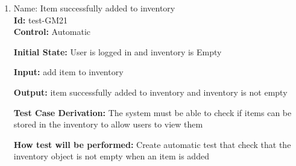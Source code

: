 \documentclass[12pt, titlepage]{article}
\begin{document}
\begin{enumerate}
\item{Name: Item successfully added to inventory \\} %
\textbf{Id:} test-GM21 \label{Test-GM21}\\

\textbf{Control:} Automatic

\textbf{Initial State:} User is logged in and inventory is Empty

\textbf{Input:} add item to inventory

\textbf{Output:} item successfully added to inventory and inventory is not empty

\textbf{Test Case Derivation:} The system must be able to check if items can be stored in the inventory to allow users to view them

\textbf{How test will be performed: }Create automatic test that check that the inventory object is not empty when an item is added

\end{enumerate}
\end{document}
